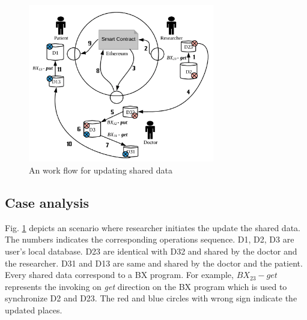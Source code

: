 \documentclass[conference]{IEEEtran}
\begin{document}
\begin{figure}[htbp]
	\centerline{\includegraphics[width=230pt]{updateScenario.png}}
	\caption{An work flow for updating shared data}
	\label{workflow}
\end{figure}

\subsection{Case analysis}
Fig. \ref{workflow} depicts an scenario where researcher initiates the update the shared data. The numbers indicates the corresponding operations sequence. D1, D2, D3 are user's local database. D23 are identical with D32 and shared by the doctor and the researcher. D31 and D13 are same and shared by the doctor and the patient. Every shared data correspond to a BX program. For example, $BX_{23}-get$ represents the invoking on \textit{get} direction on the BX program which is used to synchronize D2 and D23. The red and blue circles with wrong sign indicate the updated places.
\end{document}
